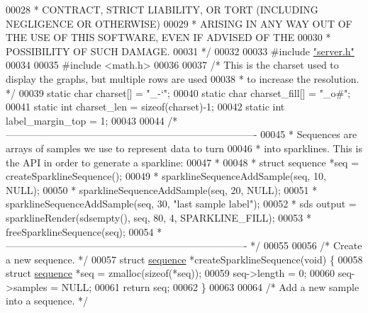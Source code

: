 \begin{DoxyCode}
00028 \textcolor{comment}{ * CONTRACT, STRICT LIABILITY, OR TORT (INCLUDING NEGLIGENCE OR OTHERWISE)}
00029 \textcolor{comment}{ * ARISING IN ANY WAY OUT OF THE USE OF THIS SOFTWARE, EVEN IF ADVISED OF THE}
00030 \textcolor{comment}{ * POSSIBILITY OF SUCH DAMAGE.}
00031 \textcolor{comment}{ */}
00032 
00033 \textcolor{preprocessor}{#}\textcolor{preprocessor}{include} \hyperlink{server_8h}{"server.h"}
00034 
00035 \textcolor{preprocessor}{#}\textcolor{preprocessor}{include} \textcolor{preprocessor}{<}\textcolor{preprocessor}{math}\textcolor{preprocessor}{.}\textcolor{preprocessor}{h}\textcolor{preprocessor}{>}
00036 
00037 \textcolor{comment}{/* This is the charset used to display the graphs, but multiple rows are used}
00038 \textcolor{comment}{ * to increase the resolution. */}
00039 \textcolor{keyword}{static} \textcolor{keywordtype}{char} charset[] = \textcolor{stringliteral}{"\_-`"};
00040 \textcolor{keyword}{static} \textcolor{keywordtype}{char} charset\_fill[] = \textcolor{stringliteral}{"\_o#"};
00041 \textcolor{keyword}{static} \textcolor{keywordtype}{int} charset\_len = \textcolor{keyword}{sizeof}(charset)-1;
00042 \textcolor{keyword}{static} \textcolor{keywordtype}{int} label\_margin\_top = 1;
00043 
00044 \textcolor{comment}{/* ----------------------------------------------------------------------------}
00045 \textcolor{comment}{ * Sequences are arrays of samples we use to represent data to turn}
00046 \textcolor{comment}{ * into sparklines. This is the API in order to generate a sparkline:}
00047 \textcolor{comment}{ *}
00048 \textcolor{comment}{ * struct sequence *seq = createSparklineSequence();}
00049 \textcolor{comment}{ * sparklineSequenceAddSample(seq, 10, NULL);}
00050 \textcolor{comment}{ * sparklineSequenceAddSample(seq, 20, NULL);}
00051 \textcolor{comment}{ * sparklineSequenceAddSample(seq, 30, "last sample label");}
00052 \textcolor{comment}{ * sds output = sparklineRender(sdsempty(), seq, 80, 4, SPARKLINE\_FILL);}
00053 \textcolor{comment}{ * freeSparklineSequence(seq);}
00054 \textcolor{comment}{ * ------------------------------------------------------------------------- */}
00055 
00056 \textcolor{comment}{/* Create a new sequence. */}
00057 \textcolor{keyword}{struct} \hyperlink{structsequence}{sequence} *createSparklineSequence(\textcolor{keywordtype}{void}) \{
00058     \textcolor{keyword}{struct} \hyperlink{structsequence}{sequence} *seq = zmalloc(\textcolor{keyword}{sizeof}(*seq));
00059     seq->length = 0;
00060     seq->samples = NULL;
00061     \textcolor{keywordflow}{return} seq;
00062 \}
00063 
00064 \textcolor{comment}{/* Add a new sample into a sequence. */}

\end{DoxyCode}
